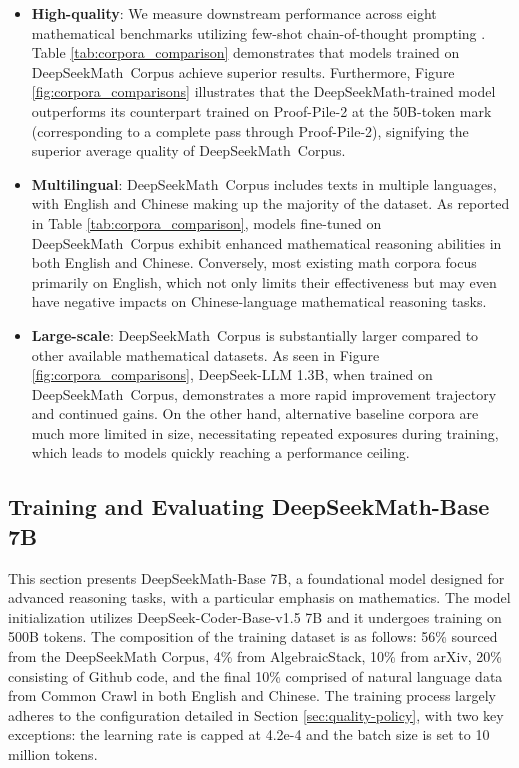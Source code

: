 \begin{itemize}[topsep=0pt]
    \item \textbf{High-quality}:
    We measure downstream performance across eight mathematical benchmarks utilizing few-shot chain-of-thought prompting \cite{cot}. Table \ref{tab:corpora_comparison} demonstrates that models trained on DeepSeekMath~Corpus achieve superior results. Furthermore, Figure \ref{fig:corpora_comparisons} illustrates that the DeepSeekMath-trained model outperforms its counterpart trained on Proof-Pile-2 at the 50B-token mark (corresponding to a complete pass through Proof-Pile-2), signifying the superior average quality of DeepSeekMath~Corpus.
    \item \textbf{Multilingual}:
    DeepSeekMath~Corpus includes texts in multiple languages, with English and Chinese making up the majority of the dataset. As reported in Table \ref{tab:corpora_comparison}, models fine-tuned on DeepSeekMath~Corpus exhibit enhanced mathematical reasoning abilities in both English and Chinese. Conversely, most existing math corpora focus primarily on English, which not only limits their effectiveness but may even have negative impacts on Chinese-language mathematical reasoning tasks.
    \item \textbf{Large-scale}:
    DeepSeekMath~Corpus is substantially larger compared to other available mathematical datasets. As seen in Figure \ref{fig:corpora_comparisons}, DeepSeek-LLM 1.3B, when trained on DeepSeekMath~Corpus, demonstrates a more rapid improvement trajectory and continued gains. On the other hand, alternative baseline corpora are much more limited in size, necessitating repeated exposures during training, which leads to models quickly reaching a performance ceiling.
\end{itemize}

\subsection{Training and Evaluating DeepSeekMath-Base 7B}

This section presents DeepSeekMath-Base 7B, a foundational model designed for advanced reasoning tasks, with a particular emphasis on mathematics. The model initialization utilizes DeepSeek-Coder-Base-v1.5 7B \citep{deepseek-coder} and it undergoes training on 500B tokens. The composition of the training dataset is as follows: 56\% sourced from the DeepSeekMath Corpus, 4\% from AlgebraicStack, 10\% from arXiv, 20\% consisting of Github code, and the final 10\% comprised of natural language data from Common Crawl in both English and Chinese. The training process largely adheres to the configuration detailed in Section \ref{sec:quality-policy}, with two key exceptions: the learning rate is capped at 4.2e-4 and the batch size is set to 10 million tokens.

